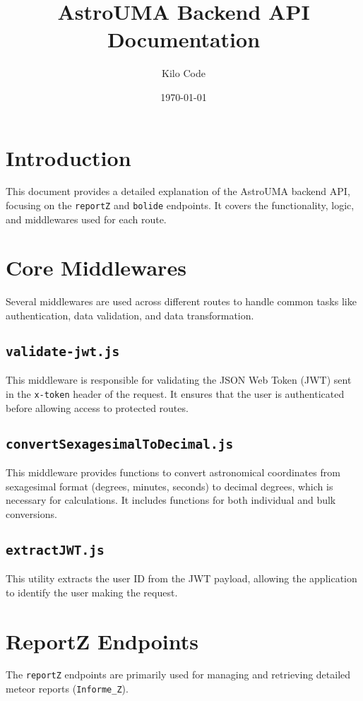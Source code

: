 \documentclass{article}
\title{AstroUMA Backend API Documentation}
\author{Kilo Code}
\date{\today}
\begin{document}
\maketitle

\tableofcontents

\newpage

\section{Introduction}
This document provides a detailed explanation of the AstroUMA backend API, focusing on the \texttt{reportZ} and \texttt{bolide} endpoints. It covers the functionality, logic, and middlewares used for each route.

\section{Core Middlewares}
Several middlewares are used across different routes to handle common tasks like authentication, data validation, and data transformation.

\subsection{\texttt{validate-jwt.js}}
This middleware is responsible for validating the JSON Web Token (JWT) sent in the \texttt{x-token} header of the request. It ensures that the user is authenticated before allowing access to protected routes.

\subsection{\texttt{convertSexagesimalToDecimal.js}}
This middleware provides functions to convert astronomical coordinates from sexagesimal format (degrees, minutes, seconds) to decimal degrees, which is necessary for calculations. It includes functions for both individual and bulk conversions.

\subsection{\texttt{extractJWT.js}}
This utility extracts the user ID from the JWT payload, allowing the application to identify the user making the request.

\section{ReportZ Endpoints}
The \texttt{reportZ} endpoints are primarily used for managing and retrieving detailed meteor reports (\texttt{Informe\_Z}).
\end{document}
